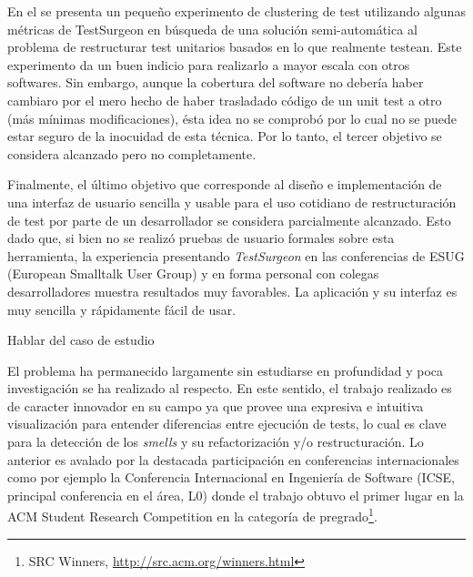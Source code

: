 \par En el  se presenta un pequeño experimento de clustering de test utilizando algunas métricas de TestSurgeon en búsqueda de una solución semi-automática al problema de restructurar test unitarios basados en lo que realmente testean. Este experimento da un buen indicio para realizarlo a mayor escala con otros softwares. Sin embargo, aunque la cobertura del software no debería haber cambiaro por el mero hecho de haber trasladado código de un unit test a otro (más mínimas modificaciones), ésta idea no se comprobó por lo cual no se puede estar seguro de la inocuidad de esta técnica. Por lo tanto, el tercer objetivo se considera alcanzado pero no completamente.

\par Finalmente, el último objetivo que corresponde al diseño e implementación de una interfaz de usuario sencilla y usable para el uso cotidiano de restructuración de test por parte de un desarrollador se considera parcialmente alcanzado. Esto dado que, si bien no se realizó pruebas de usuario formales sobre esta herramienta, la experiencia presentando \emph{TestSurgeon} en las conferencias de ESUG (European Smalltalk User Group) y en forma personal con colegas desarrolladores muestra resultados muy favorables. La aplicación y su interfaz es muy sencilla y rápidamente fácil de usar.

\par Hablar del caso de estudio

\par El problema ha permanecido largamente sin estudiarse en profundidad y poca investigación se ha realizado al respecto. En este sentido, el trabajo realizado es de caracter innovador en su campo ya que provee una expresiva e intuitiva visualización para entender diferencias entre ejecución de tests, lo cual es clave para la detección de los \emph{smells} y su refactorización y/o restructuración. Lo anterior es avalado por la destacada participación en conferencias internacionales como por ejemplo la Conferencia Internacional en Ingeniería de Software (ICSE, principal conferencia en el área, L0) donde el trabajo obtuvo el primer lugar en la ACM Student Research Competition en la categoría de pregrado\footnote{SRC Winners, \url{http://src.acm.org/winners.html}}.  

